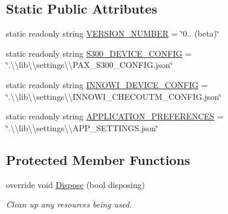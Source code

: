 \subsection*{Static Public Attributes}
\begin{DoxyCompactItemize}
\item 
static readonly string \mbox{\hyperlink{class_cert_complete_1_1_cert_complete_ae07487144f4788f7dd165a05fa41f1d3}{V\+E\+R\+S\+I\+O\+N\+\_\+\+N\+U\+M\+B\+ER}} = \char`\"{}0.. (beta)\char`\"{}
\item 
static readonly string \mbox{\hyperlink{class_cert_complete_1_1_cert_complete_ad961ad31303bfdb2496fd44d45745ff1}{S300\+\_\+\+D\+E\+V\+I\+C\+E\+\_\+\+C\+O\+N\+F\+IG}} = \char`\"{}.\textbackslash{}\textbackslash{}lib\textbackslash{}\textbackslash{}settings\textbackslash{}\textbackslash{}\+P\+A\+X\+\_\+\+S300\+\_\+\+C\+O\+N\+F\+I\+G.\+json\char`\"{}
\item 
static readonly string \mbox{\hyperlink{class_cert_complete_1_1_cert_complete_a73c72e8c2abd32a4327f63905994e6cf}{I\+N\+N\+O\+W\+I\+\_\+\+D\+E\+V\+I\+C\+E\+\_\+\+C\+O\+N\+F\+IG}} = \char`\"{}.\textbackslash{}\textbackslash{}lib\textbackslash{}\textbackslash{}settings\textbackslash{}\textbackslash{}\+I\+N\+N\+O\+W\+I\+\_\+\+C\+H\+E\+C\+O\+U\+T\+M\+\_\+\+C\+O\+N\+F\+I\+G.\+json\char`\"{}
\item 
static readonly string \mbox{\hyperlink{class_cert_complete_1_1_cert_complete_a192cfecad203105cb51d9690cd239ad1}{A\+P\+P\+L\+I\+C\+A\+T\+I\+O\+N\+\_\+\+P\+R\+E\+F\+E\+R\+E\+N\+C\+ES}} = \char`\"{}.\textbackslash{}\textbackslash{}lib\textbackslash{}\textbackslash{}settings\textbackslash{}\textbackslash{}\+A\+P\+P\+\_\+\+S\+E\+T\+T\+I\+N\+G\+S.\+json\char`\"{}
\end{DoxyCompactItemize}
\subsection*{Protected Member Functions}
\begin{DoxyCompactItemize}
\item 
override void \mbox{\hyperlink{class_cert_complete_1_1_cert_complete_af5c626434cd663b9c85b3fd89362718b}{Dispose}} (bool disposing)
\begin{DoxyCompactList}\small\item\em Clean up any resources being used. \end{DoxyCompactList}\end{DoxyCompactItemize}

